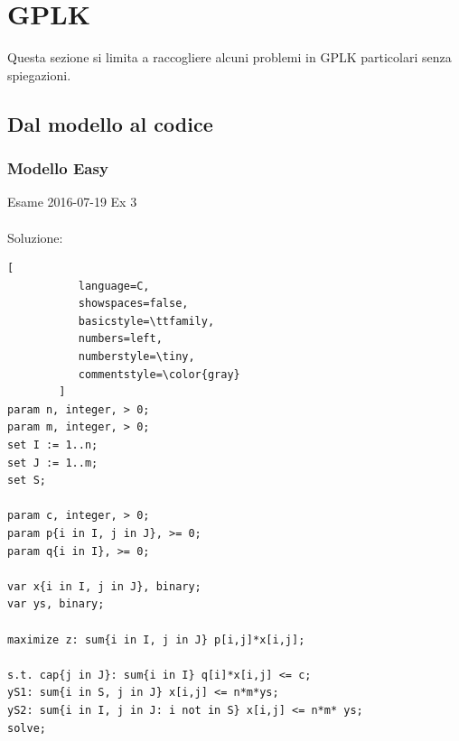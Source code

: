 \documentclass{article}
\begin{document}
\newpage
\section{GPLK}

\UseRawInputEncoding
{}
Questa sezione si limita a raccogliere alcuni problemi in GPLK particolari senza spiegazioni.

\subsection{Dal modello al codice}
\subsubsection{Modello Easy}
Esame 2016-07-19 Ex 3\\
\noindent{}%
\\
Soluzione:\\
\begin{lstlisting}[
           language=C,
           showspaces=false,
           basicstyle=\ttfamily,
           numbers=left,
           numberstyle=\tiny,
           commentstyle=\color{gray}
        ]
param n, integer, > 0;
param m, integer, > 0;
set I := 1..n;
set J := 1..m;
set S;

param c, integer, > 0;
param p{i in I, j in J}, >= 0;
param q{i in I}, >= 0;

var x{i in I, j in J}, binary;
var ys, binary;

maximize z: sum{i in I, j in J} p[i,j]*x[i,j];

s.t. cap{j in J}: sum{i in I} q[i]*x[i,j] <= c;
yS1: sum{i in S, j in J} x[i,j] <= n*m*ys;
yS2: sum{i in I, j in J: i not in S} x[i,j] <= n*m* ys;
solve;

\end{lstlisting}
\end{document}

